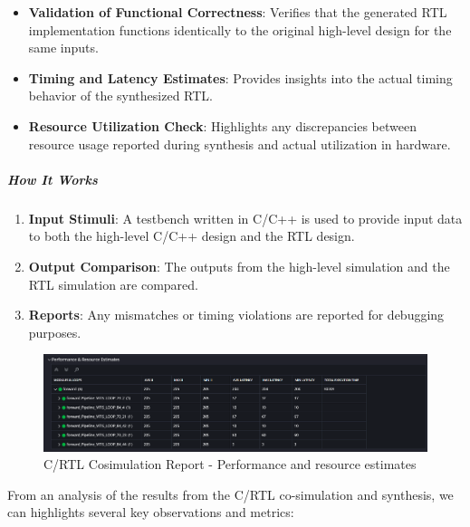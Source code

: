 \documentclass{article}
\begin{document}
\begin{itemize}
    \item \textbf{Validation of Functional Correctness}: Verifies that the generated RTL implementation functions identically to the original high-level design for the same inputs.
    \item \textbf{Timing and Latency Estimates}: Provides insights into the actual timing behavior of the synthesized RTL.
    \item \textbf{Resource Utilization Check}: Highlights any discrepancies between resource usage reported during synthesis and actual utilization in hardware.
\end{itemize}

\subparagraph{How It Works}
\begin{enumerate}
    \item \textbf{Input Stimuli}: A testbench written in C/C++ is used to provide input data to both the high-level C/C++ design and the RTL design.
    \item \textbf{Output Comparison}: The outputs from the high-level simulation and the RTL simulation are compared.
    \item \textbf{Reports}: Any mismatches or timing violations are reported for debugging purposes.
\end{enumerate}


\begin{figure}[H]
    \centering
    \includegraphics[width=1\textwidth]{./assets/MLP/c-rtl-cosimulation.png}
    \caption{C/RTL Cosimulation Report - Performance and resource estimates}
    \label{fig:C-RTL-cosimulation-mlp}
\end{figure}


From an analysis of the results from the C/RTL co-simulation and synthesis, we can highlights several key observations and metrics:
\end{document}
